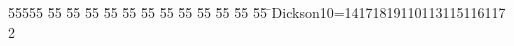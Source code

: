 %
%
\begin{tabbing}
55555 \= 55 \= 55 \= 55 \= 55 \= 55 \= 55 \= 55 \= 55 \= 55 \= 55 \= 55 \= 55 \= \>Dickson10=14171819110113115116117\\[0pt]
2\>\end{tabbing}
